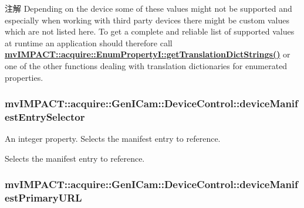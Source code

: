 \begin{DoxyNote}{注解}
Depending on the device some of these values might not be supported and especially when working with third party devices there might be custom values which are not listed here. To get a complete and reliable list of supported values at runtime an application should therefore call {\bfseries \hyperlink{classmv_i_m_p_a_c_t_1_1acquire_1_1_enum_property_i_a0ba6ccbf5ee69784d5d0b537924d26b6}{mv\+I\+M\+P\+A\+C\+T\+::acquire\+::\+Enum\+Property\+I\+::get\+Translation\+Dict\+Strings()}} or one of the other functions dealing with translation dictionaries for enumerated properties. 
\end{DoxyNote}
\hypertarget{classmv_i_m_p_a_c_t_1_1acquire_1_1_gen_i_cam_1_1_device_control_a2c1da302e9042160f42e6d7eb8e2b15a}{
\subsubsection[{device\+Manifest\+Entry\+Selector}]{ mv\+I\+M\+P\+A\+C\+T\+::acquire\+::\+Gen\+I\+Cam\+::\+Device\+Control\+::device\+Manifest\+Entry\+Selector}}\label{classmv_i_m_p_a_c_t_1_1acquire_1_1_gen_i_cam_1_1_device_control_a2c1da302e9042160f42e6d7eb8e2b15a}


An integer property. Selects the manifest entry to reference. 

Selects the manifest entry to reference. \hypertarget{classmv_i_m_p_a_c_t_1_1acquire_1_1_gen_i_cam_1_1_device_control_a7149dfeeae3a7f842d169ba9618610a9}{
\subsubsection[{device\+Manifest\+Primary\+U\+R\+L}]{ mv\+I\+M\+P\+A\+C\+T\+::acquire\+::\+Gen\+I\+Cam\+::\+Device\+Control\+::device\+Manifest\+Primary\+U\+R\+L}}\label{classmv_i_m_p_a_c_t_1_1acquire_1_1_gen_i_cam_1_1_device_control_a7149dfeeae3a7f842d169ba9618610a9}



